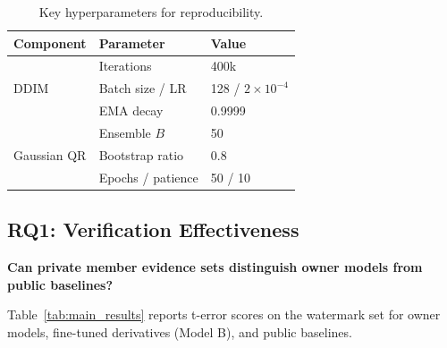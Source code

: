 \documentclass{article}
\begin{document}
\begin{table}[t]
\caption{Key hyperparameters for reproducibility.}
\label{tab:hyperparams}
\vskip 0.05in
\begin{center}
\begin{small}
\begin{tabular}{@{}lll@{}}
\toprule
Component & Parameter & Value \\
\midrule
\multirow{3}{*}{DDIM} & Iterations & 400k \\
& Batch size / LR & 128 / $2{\times}10^{-4}$ \\
& EMA decay & 0.9999 \\
\midrule
\multirow{3}{*}{Gaussian QR} & Ensemble $B$ & 50 \\
& Bootstrap ratio & 0.8 \\
& Epochs / patience & 50 / 10 \\
\bottomrule
\end{tabular}
\end{small}
\end{center}
\vskip -0.15in
\end{table}

\subsection{RQ1: Verification Effectiveness}
\label{sec:main_results}

\textbf{Can private member evidence sets distinguish owner models from public baselines?}

Table~\ref{tab:main_results} reports t-error scores on the watermark set for owner models, fine-tuned derivatives (Model B), and public baselines.
\end{document}
